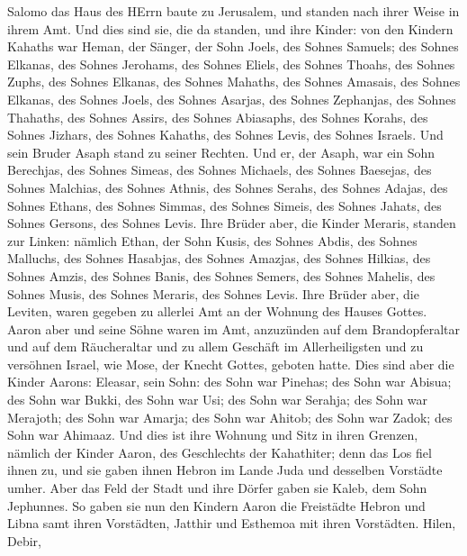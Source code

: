 Salomo das Haus des HErrn baute zu Jerusalem, und standen nach ihrer
Weise in ihrem Amt.  Und dies sind sie, die da standen, und
ihre Kinder: von den Kindern Kahaths war Heman, der Sänger, der Sohn
Joels, des Sohnes Samuels;  des Sohnes Elkanas, des Sohnes
Jerohams, des Sohnes Eliels, des Sohnes Thoahs,  des Sohnes
Zuphs, des Sohnes Elkanas, des Sohnes Mahaths, des Sohnes Amasais,
 des Sohnes Elkanas, des Sohnes Joels, des Sohnes Asarjas,
des Sohnes Zephanjas,  des Sohnes Thahaths, des Sohnes
Assirs, des Sohnes Abiasaphs, des Sohnes Korahs,  des
Sohnes Jizhars, des Sohnes Kahaths, des Sohnes Levis, des Sohnes
Israels.  Und sein Bruder Asaph stand zu seiner Rechten.
Und er, der Asaph, war ein Sohn Berechjas, des Sohnes Simeas,
 des Sohnes Michaels, des Sohnes Baesejas, des Sohnes
Malchias,  des Sohnes Athnis, des Sohnes Serahs, des Sohnes
Adajas,  des Sohnes Ethans, des Sohnes Simmas, des Sohnes
Simeis,  des Sohnes Jahats, des Sohnes Gersons, des Sohnes
Levis.  Ihre Brüder aber, die Kinder Meraris, standen zur
Linken: nämlich Ethan, der Sohn Kusis, des Sohnes Abdis, des Sohnes
Malluchs,  des Sohnes Hasabjas, des Sohnes Amazjas, des
Sohnes Hilkias,  des Sohnes Amzis, des Sohnes Banis, des
Sohnes Semers,  des Sohnes Mahelis, des Sohnes Musis, des
Sohnes Meraris, des Sohnes Levis.  Ihre Brüder aber, die
Leviten, waren gegeben zu allerlei Amt an der Wohnung des Hauses Gottes.
 Aaron aber und seine Söhne waren im Amt, anzuzünden auf
dem Brandopferaltar und auf dem Räucheraltar und zu allem Geschäft im
Allerheiligsten und zu versöhnen Israel, wie Mose, der Knecht Gottes,
geboten hatte.  Dies sind aber die Kinder Aarons: Eleasar,
sein Sohn: des Sohn war Pinehas; des Sohn war Abisua;  des
Sohn war Bukki, des Sohn war Usi; des Sohn war Serahja; 
des Sohn war Merajoth; des Sohn war Amarja; des Sohn war Ahitob;
 des Sohn war Zadok; des Sohn war Ahimaaz. 
Und dies ist ihre Wohnung und Sitz in ihren Grenzen, nämlich der Kinder
Aaron, des Geschlechts der Kahathiter; denn das Los fiel ihnen zu,
 und sie gaben ihnen Hebron im Lande Juda und desselben
Vorstädte umher.  Aber das Feld der Stadt und ihre Dörfer
gaben sie Kaleb, dem Sohn Jephunnes.  So gaben sie nun den
Kindern Aaron die Freistädte Hebron und Libna samt ihren Vorstädten,
Jatthir und Esthemoa mit ihren Vorstädten.  Hilen, Debir,
